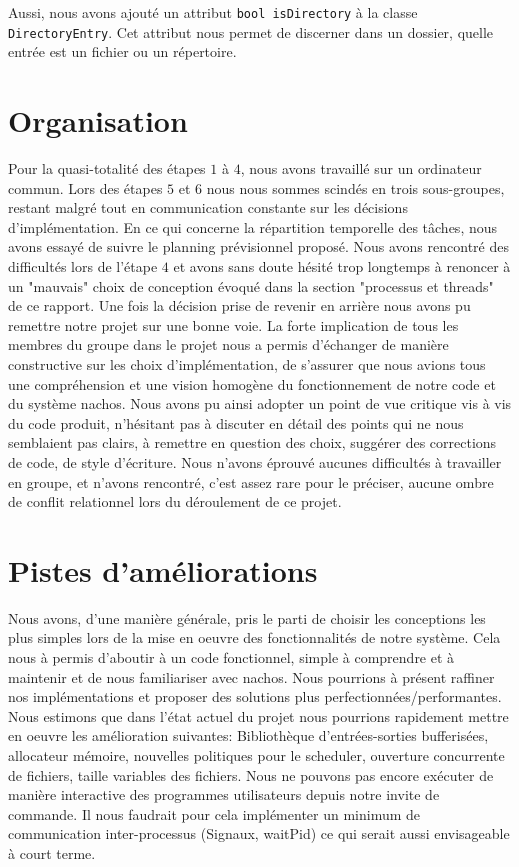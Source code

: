 \documentclass[11pt]{article}
\theoremstyle{definition}
\theoremstyle{definition}
\begin{document}
Aussi, nous avons ajouté un attribut \texttt{bool isDirectory} à la classe
\texttt{Directory}\hspace{0pt}\texttt{Entry}. Cet attribut nous permet de discerner dans un dossier, quelle entrée est un fichier ou un répertoire.

\section{Organisation}
Pour la quasi-totalité des étapes $1$ à $4$, nous avons travaillé sur un ordinateur commun.
Lors des étapes $5$ et $6$ nous nous sommes scindés en trois sous-groupes, restant malgré tout en communication constante sur les décisions d'implémentation. En ce qui concerne la répartition temporelle des tâches, nous avons essayé de suivre le planning prévisionnel proposé. Nous avons rencontré des difficultés lors de l'étape $4$ et avons sans doute hésité trop longtemps à renoncer à un "mauvais" choix de conception évoqué dans la section "processus et threads" de ce rapport. Une fois la décision prise de revenir en arrière nous avons pu remettre notre projet sur une bonne voie.
La forte implication de tous les membres du groupe dans le projet nous a permis d'échanger de manière constructive sur les choix d'implémentation, de s'assurer que nous avions tous une compréhension et une vision homogène du fonctionnement de notre code et du système nachos. Nous avons pu ainsi adopter un point de vue critique vis à vis du code produit, n'hésitant pas à discuter en détail des points qui ne nous semblaient pas clairs, à remettre en question des choix,
suggérer des corrections de code, de style d'écriture. Nous n'avons éprouvé aucunes difficultés à travailler en groupe, et n'avons rencontré, c'est assez rare pour le préciser, aucune ombre de conflit relationnel lors du déroulement de ce projet.

\section{Pistes d'améliorations}
Nous avons, d'une manière générale, pris le parti de choisir les conceptions les plus simples
lors de la mise en oeuvre des fonctionnalités de notre système. Cela nous à permis d'aboutir
à un code fonctionnel, simple à comprendre et à maintenir et de nous familiariser avec nachos.
Nous pourrions à présent raffiner nos implémentations et proposer des solutions plus perfectionnées/performantes.
Nous estimons que dans l'état actuel du projet nous pourrions rapidement mettre en oeuvre les amélioration suivantes:
Bibliothèque d'entrées-sorties bufferisées, allocateur mémoire, nouvelles politiques pour le scheduler, ouverture concurrente de fichiers, taille variables des fichiers.
Nous ne pouvons pas encore exécuter de manière interactive des programmes utilisateurs depuis notre invite de commande. Il nous faudrait pour cela implémenter un minimum de communication inter-processus (Signaux, waitPid) ce qui serait aussi envisageable à court terme.
\end{document}
